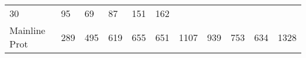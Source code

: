 \documentclass[]{article}
\begin{document}
\begin{longtable}[]{@{}lllllllllll@{}}
\begin{minipage}[t]{0.05\columnwidth}
30\strut
\end{minipage} & \begin{minipage}[t]{0.05\columnwidth}\raggedright
95\strut
\end{minipage} & \begin{minipage}[t]{0.06\columnwidth}\raggedright
69\strut
\end{minipage} & \begin{minipage}[t]{0.06\columnwidth}\raggedright
87\strut
\end{minipage} & \begin{minipage}[t]{0.04\columnwidth}\raggedright
151\strut
\end{minipage} & \begin{minipage}[t]{0.11\columnwidth}\raggedright
162\strut
\end{minipage}\tabularnewline
\begin{minipage}[t]{0.14\columnwidth}\raggedright
Mainline Prot\strut
\end{minipage} & \begin{minipage}[t]{0.04\columnwidth}\raggedright
289\strut
\end{minipage} & \begin{minipage}[t]{0.05\columnwidth}\raggedright
495\strut
\end{minipage} & \begin{minipage}[t]{0.05\columnwidth}\raggedright
619\strut
\end{minipage} & \begin{minipage}[t]{0.05\columnwidth}\raggedright
655\strut
\end{minipage} & \begin{minipage}[t]{0.05\columnwidth}\raggedright
651\strut
\end{minipage} & \begin{minipage}[t]{0.05\columnwidth}\raggedright
1107\strut
\end{minipage} & \begin{minipage}[t]{0.06\columnwidth}\raggedright
939\strut
\end{minipage} & \begin{minipage}[t]{0.06\columnwidth}\raggedright
753\strut
\end{minipage} & \begin{minipage}[t]{0.04\columnwidth}\raggedright
634\strut
\end{minipage} & \begin{minipage}[t]{0.11\columnwidth}\raggedright
1328\strut
\end{minipage}\tabularnewline

\end{longtable}
\end{document}
